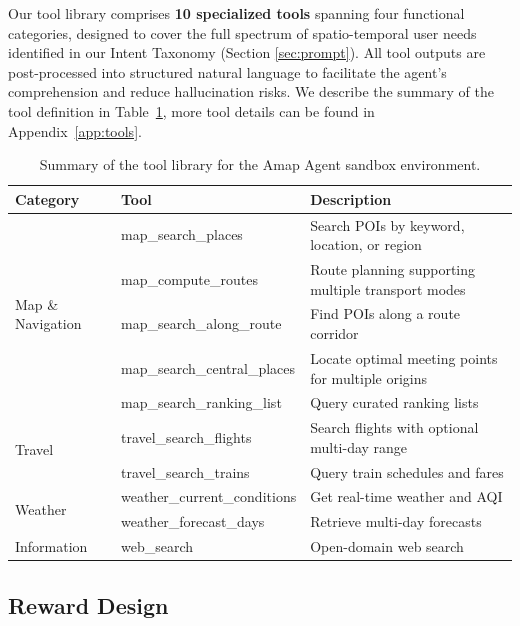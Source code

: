 \documentclass{article} %
\newcommand{\amapagent}{Amap Agent }
\begin{document}
Our tool library comprises \textbf{10 specialized tools} spanning four functional categories, designed to cover the full spectrum of spatio-temporal user needs identified in our Intent Taxonomy (Section \ref{sec:prompt}). All tool outputs are post-processed into structured natural language to facilitate the agent's comprehension and reduce hallucination risks. We describe the summary of the tool definition in Table~\ref{tab:tool_library}, more tool details can be found in Appendix~\ref{app:tools}.
\begin{table}[htbp]
\centering
\caption{Summary of the tool library for the \amapagent sandbox environment.}
\label{tab:tool_library}
\begin{tabular}{@{}lll@{}}
\toprule
\textbf{Category} & \textbf{Tool} & \textbf{Description} \\
\midrule
\multirow{5}{*}{Map \& Navigation}
& map\_search\_places & Search POIs by keyword, location, or region \\
& map\_compute\_routes & Route planning supporting multiple transport modes \\
& map\_search\_along\_route & Find POIs along a route corridor \\
& map\_search\_central\_places & Locate optimal meeting points for multiple origins \\
& map\_search\_ranking\_list & Query curated ranking lists \\
\midrule
\multirow{2}{*}{Travel}
& travel\_search\_flights & Search flights with optional multi-day range \\
& travel\_search\_trains & Query train schedules and fares \\
\midrule
\multirow{2}{*}{Weather}
& weather\_current\_conditions & Get real-time weather and AQI \\
& weather\_forecast\_days & Retrieve multi-day forecasts \\
\midrule
Information & web\_search & Open-domain web search \\
\bottomrule
\end{tabular}
\end{table}




    

    





\subsection{Reward Design}
\label{sec:reward}
\end{document}

